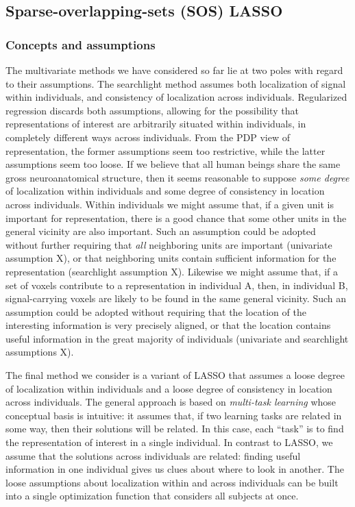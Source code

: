 \subsection{Sparse-overlapping-sets (SOS) LASSO}
\subsubsection{Concepts and assumptions}
The multivariate methods we have considered so far lie at two poles with regard to their assumptions. The searchlight method assumes both localization of signal within individuals, and consistency of localization across individuals. Regularized regression discards both assumptions, allowing for the possibility that representations of interest are arbitrarily situated within individuals, in completely different ways across individuals. From the PDP view of representation, the former assumptions seem too restrictive, while the latter assumptions seem too loose. If we believe that all human beings share the same gross neuroanatomical structure, then it seems reasonable to suppose {\em some degree} of localization within individuals and some degree of consistency in location across individuals. Within individuals we might assume that, if a given unit is important for representation, there is a good chance that some other units in the general vicinity are also important. Such an assumption could be adopted without further requiring that {\em all} neighboring units are important (univariate assumption X), or that neighboring units contain sufficient information for the representation (searchlight assumption X). Likewise we might assume that, if a set of voxels contribute to a representation in individual A, then, in individual B, signal-carrying voxels are likely to be found in the same general vicinity. Such an assumption could be adopted without requiring that the location of the interesting information is very precisely aligned, or that the location contains useful information in the great majority of individuals (univariate and searchlight assumptions X).

The final method we consider is a variant of LASSO that assumes a loose degree of localization within individuals and a loose degree of consistency in location across individuals. The general approach is based on {\em multi-task learning} whose conceptual basis is intuitive: it assumes that, if two learning tasks are related in some way, then their solutions will be related. In this case, each ``task'' is to find the representation of interest in a single individual. In contrast to LASSO, we assume that the solutions across individuals are related: finding useful information in one individual gives us clues about where to look in another. The loose assumptions about localization within and across individuals can be built into a single optimization function that considers all subjects at once.

